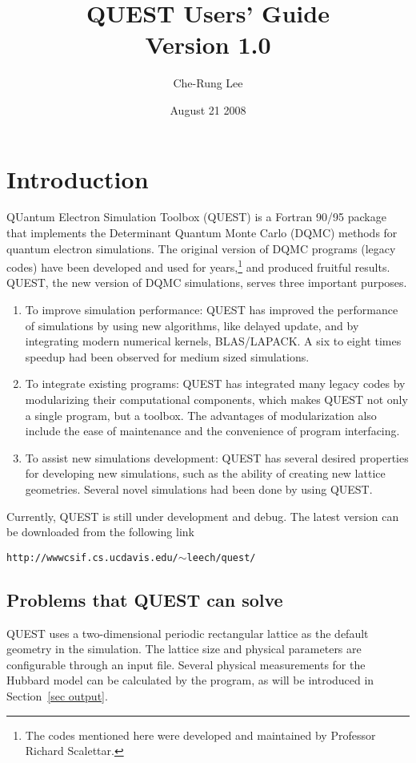 \documentclass[12pt]{article}
\title{QUEST Users' Guide \\  
Version 1.0}
\author{Che-Rung Lee}
\date{August 21 2008}
\begin{document}
\maketitle
\newpage
\tableofcontents
\thispagestyle{empty}
\newpage
\section{Introduction}
   QUantum Electron Simulation Toolbox (QUEST) is a Fortran
   90/95 package that implements the Determinant Quantum Monte Carlo (DQMC) methods for
   quantum electron simulations.
   The original version of DQMC programs (legacy codes) have been
   developed and used for years,\footnote{The codes mentioned here were developed and maintained by Professor Richard Scalettar.} and produced fruitful results.
   QUEST, the new version of DQMC simulations, serves three important purposes.
   \begin{enumerate}
     \item To improve simulation performance: QUEST has improved the performance of simulations by using new algorithms, like delayed update, and by integrating modern numerical kernels, BLAS/LAPACK. A six to eight times speedup had been observed for medium sized simulations.
     \item To integrate existing programs: QUEST has integrated many legacy codes by modularizing their computational components, which makes QUEST not only a single program, but a toolbox. The advantages of modularization also include the ease of maintenance and the convenience of program interfacing.
     \item To assist new simulations development: QUEST has several desired properties for developing new simulations, such as the ability of creating new lattice geometries. Several novel simulations had been done by using QUEST.
   \end{enumerate}

    Currently, QUEST is still under development and debug.
    The latest version can be downloaded from the following link
    \begin{center}
    {\tt http://wwwcsif.cs.ucdavis.edu/$\sim$leech/quest/}
    \end{center}

\subsection{Problems that QUEST can solve}
    QUEST uses a two-dimensional periodic rectangular lattice as
    the default geometry in the simulation. The lattice size and physical parameters are configurable through an input file.
    Several physical measurements for the Hubbard model can be calculated by the program, as will be introduced in Section~\ref{sec output}.
\end{document}
